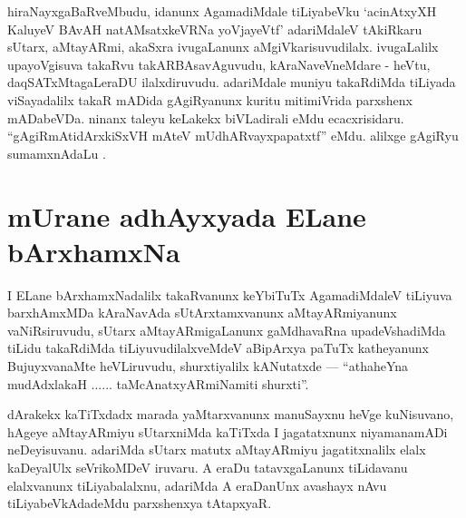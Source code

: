 \begin{artha}
hiraNayxgaBaRveMbudu, idanunx AgamadiMdale tiLiyabeVku `acinAtxyXH KaluyeV BAvAH natAMsatxkeVRNa yoVjayeVtf' adariMdaleV tAkiRkaru sUtarx, aMtayARmi, akaSxra ivugaLanunx aMgiVkarisuvudilalx. ivugaLalilx upayoVgisuva takaRvu takARBAsavAguvudu, kAraNaveVneMdare - heVtu, daqSATxMtagaLeraDU ilalxdiruvudu. adariMdale muniyu takaRdiMda tiLiyada viSayadalilx takaR mADida gAgiRyanunx kuritu mitimiVrida parxshenx mADabeVDa. ninanx taleyu keLakekx biVLadirali eMdu ecacxrisidaru. ``gAgiRmAtidArxkiSxVH mAteV mUdhARvayxpapatxtf'' eMdu. alilxge gAgiRyu sumamxnAdaLu .
\end{artha}


\section*{mUrane adhAyxyada ELane bArxhamxNa}


\begin{artha}
I ELane bArxhamxNadalilx takaRvanunx keYbiTuTx AgamadiMdaleV tiLiyuva barxhAmxMDa kAraNavAda sUtArxtamxvanunx aMtayARmiyanunx vaNiRsiruvudu, sUtarx aMtayARmigaLanunx gaMdhavaRna upadeVshadiMda tiLidu takaRdiMda tiLiyuvudilalxveMdeV aBipArxya paTuTx katheyanunx BujuyxvanaMte heVLiruvudu, shurxtiyalilx kANutatxde --- ``athaheYna mudAdxlakaH ...... taMcAnatxyARmiNamiti shurxti''.
\end{artha}


\begin{artha}
dArakekx kaTiTxdadx marada yaMtarxvanunx manuSayxnu heVge kuNisuvano, hAgeye aMtayARmiyu sUtarxniMda kaTiTxda I jagatatxnunx niyamanamADi neDeyisuvanu. adariMda sUtarx matutx aMtayARmiyu jagatitxnalilx elalx kaDeyalUlx seVrikoMDeV iruvaru. A eraDu tatavxgaLanunx tiLidavanu elalxvanunx tiLiyabalalxnu, adariMda A eraDanUnx avashayx nAvu tiLiyabeVkAdadeMdu parxshenxya tAtapxyaR.
\end{artha}



